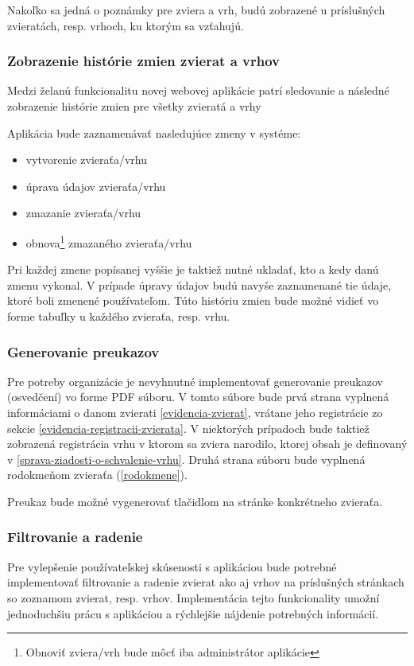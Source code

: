 Nakoľko sa jedná o poznámky pre zviera a vrh, budú zobrazené u príslušných zvieratách, resp. vrhoch, ku ktorým sa vzťahujú.

\subsubsection{Zobrazenie histórie zmien zvierat a vrhov}
Medzi želanú funkcionalitu novej webovej aplikácie patrí sledovanie a následné zobrazenie histórie zmien pre všetky zvieratá a vrhy

Aplikácia bude zaznamenávať nasledujúce zmeny v systéme:
\begin{itemize}
	\item vytvorenie zvieraťa/vrhu
	\item úprava údajov zvieraťa/vrhu
	\item zmazanie zvieraťa/vrhu
	\item obnova\footnote{Obnoviť zviera/vrh bude môcť iba administrátor aplikácie} zmazaného zvieraťa/vrhu
\end{itemize}

Pri každej zmene popísanej vyššie je taktiež nutné ukladať, kto a kedy danú zmenu vykonal. V prípade úpravy údajov budú navyše zaznamenané tie údaje, ktoré boli zmenené používateľom. Túto históriu zmien bude možné vidieť vo forme tabuľky u každého zvieraťa, resp. vrhu.

\subsubsection{Generovanie preukazov}\label{generovanie-preukazov}
Pre potreby organizácie je nevyhnutné implementovať generovanie preukazov (osvedčení) vo forme PDF súboru. V tomto súbore bude prvá strana vyplnená informáciami o danom zvierati \ref{evidencia-zvierat}, vrátane jeho registrácie zo sekcie \ref{evidencia-registracii-zvierata}. V niektorých prípadoch bude taktiež zobrazená registrácia vrhu v ktorom sa zviera narodilo, ktorej obsah je definovaný v \ref{sprava-ziadosti-o-schvalenie-vrhu}. Druhá strana súboru bude vyplnená rodokmeňom zvieraťa (\ref{rodokmene}).

Preukaz bude možné vygenerovať tlačidlom na stránke konkrétneho zvieraťa.

\subsubsection{Filtrovanie a radenie}\label{filtrovanie-a-radenie}
Pre vylepšenie používateľskej skúsenosti s aplikáciou bude potrebné implementovať filtrovanie a radenie zvierat ako aj vrhov na príslušných stránkach so zoznamom zvierat, resp. vrhov. Implementácia tejto funkcionality umožní jednoduchšiu prácu s aplikáciou a rýchlejšie nájdenie potrebných informácií.

